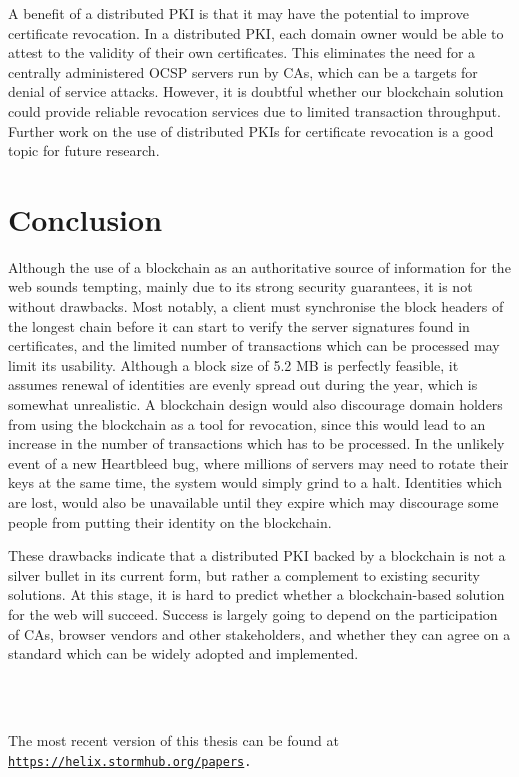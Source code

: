 \documentclass{style/kththesis}
\begin{document}
A benefit of a distributed PKI is that it may have the potential to improve certificate revocation. In a distributed PKI, each domain owner would be able to attest to the validity of their own certificates. This eliminates the need for a centrally administered OCSP servers run by CAs, which can be a targets for denial of service attacks. However, it is doubtful whether our blockchain solution could provide reliable revocation services due to limited transaction throughput. Further work on the use of distributed PKIs for certificate revocation is a good topic for future research.

\section{Conclusion}
Although the use of a blockchain as an authoritative source of information for the web sounds tempting, mainly due to its strong security guarantees, it is not without drawbacks. Most notably, a client must synchronise the block headers of the longest chain before it can start to verify the server signatures found in certificates, and the limited number of transactions which can be processed may limit its usability. Although a block size of 5.2 MB is perfectly feasible, it assumes renewal of identities are evenly spread out during the year, which is somewhat unrealistic. A blockchain design would also discourage domain holders from using the blockchain as a tool for revocation, since this would lead to an increase in the number of transactions which has to be processed. In the unlikely event of a new Heartbleed bug, where millions of servers may need to rotate their keys at the same time, the system would simply grind to a halt. Identities which are lost, would also be unavailable until they expire which may discourage some people from putting their identity on the blockchain. 

These drawbacks indicate that a distributed PKI backed by a blockchain is not a silver bullet in its current form, but rather a complement to existing security solutions. At this stage, it is hard to predict whether a blockchain-based solution for the web will succeed. Success is largely going to depend on the participation of CAs, browser vendors and other stakeholders, and whether they can agree on a standard which can be widely adopted and implemented.

\ifbook
\begin{flushleft}

\end{flushleft}
\else


\\\\
\begin{mdframed}[backgroundcolor=white,leftline=false,bottomline=false,rightline=false,innerleftmargin=0pt,innerrightmargin=0pt,innertopmargin=10pt,innerbottommargin=0pt]The most recent version of this thesis can be found at \texttt{\href{https://helix.stormhub.org/papers}{https://helix.stormhub.org/papers}.}
\end{mdframed}
\def\bibfont{\scriptsize}
\begin{flushleft}

\end{flushleft}
\fi
\end{document}
